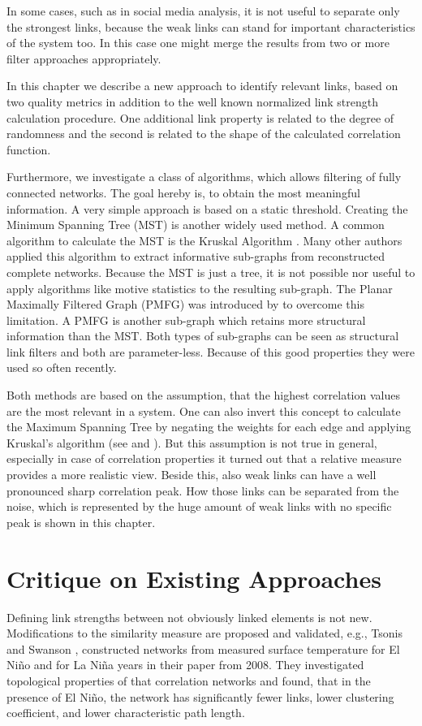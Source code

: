 \documentclass[a4paper,10pt]{scrbook}
\begin{document}
In some cases, such as in social media analysis, it is not useful to separate only the strongest links, because the weak links can stand for important characteristics of the system too. In this case one might merge the results from two or more filter approaches appropriately.  

In this chapter we describe a new approach to identify relevant links, based on two quality metrics in addition to the well known normalized link strength calculation procedure. One additional link property is related to the degree of randomness and the second is related to the shape of the calculated correlation function.

Furthermore, we investigate a class of algorithms, which allows filtering of fully connected networks. The goal hereby is, to obtain the most meaningful information. A very simple approach is based on a static threshold. Creating the Minimum Spanning Tree (MST) is another widely used method. A common algorithm to calculate the MST is the Kruskal Algorithm \cite{KruskalALGORITHM}. Many other authors applied this algorithm to extract informative sub-graphs from reconstructed complete networks. Because the MST is just a tree, it is not possible nor useful to apply algorithms like motive statistics to the resulting sub-graph. The Planar Maximally Filtered Graph (PMFG) was introduced by \cite{Tumminello2005} to overcome this limitation. A PMFG is another sub-graph which retains more structural information than the MST. Both types of sub-graphs can be seen as structural link filters and both are parameter-less. Because of this good properties they were used so often recently. 

Both methods are based on the assumption, that the highest correlation values are the most relevant in a system. One can also invert this concept to calculate the Maximum Spanning Tree by negating the weights for each edge and applying Kruskal's algorithm (see \cite{Pemmaraju2003} and \cite{WOLFRAM.MST}).
But this assumption is not true in general, especially in case of correlation properties it turned out that a relative measure provides a more realistic view. Beside this, also weak links can have a well pronounced sharp correlation peak. How those links can be separated from the noise, which is represented by the huge amount of weak links with no specific peak is shown in this chapter. 

\section{Critique on Existing Approaches}
Defining link strengths between not obviously linked elements is not new. Modifications to the similarity measure are proposed and validated, e.g., Tsonis and Swanson \cite{PhysRevLett.100.228502}, constructed 
networks from measured surface temperature for El Ni\~no and for La Ni\~na years in their paper from 2008. They investigated topological properties of that correlation networks and found, that in the presence of El Ni\~no, the network has significantly fewer links, lower clustering coefficient, and lower characteristic path length.
\end{document}

